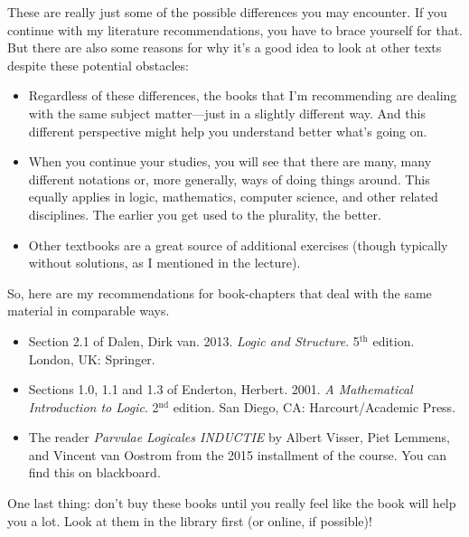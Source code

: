 These are really just some of the possible differences you may encounter. If you continue with my literature recommendations, you have to brace yourself for that. But there are also some reasons for why it's a good idea to look at other texts despite these potential obstacles:
	\begin{itemize}
	
		\item Regardless of these differences, the books that I'm recommending are dealing with the same subject matter---just in a slightly different way. And this different perspective might help you understand better what's going on.
		
		\item When you continue your studies, you will see that there are  many, many different notations or, more generally, ways of doing things around. This equally applies in logic, mathematics, computer science, and other related disciplines. The earlier you get used to the plurality, the better.
			
		\item Other textbooks are a great source of additional exercises (though typically without solutions, as I mentioned in the lecture).	
			
	\end{itemize}
So, here are my recommendations for book-chapters that deal with the same material in comparable ways. 

	\begin{itemize}
	
		\item Section 2.1 of Dalen, Dirk van. 2013. \emph{Logic and Structure}. 5$^\text{th}$ edition. London, UK: Springer.
		
		\item Sections 1.0, 1.1 and 1.3 of Enderton, Herbert. 2001. \emph{A Mathematical Introduction to Logic}. 2$^\text{nd}$ edition. San Diego, CA: Harcourt/Academic Press.
		
		\item The reader \emph{Parvulae Logicales INDUCTIE} by Albert Visser, Piet Lemmens, and Vincent van Oostrom from the 2015 installment of the course. You can find this on blackboard.
	
	\end{itemize}
One last thing: don't buy these books until you really feel like the book will help you a lot. Look at them in the library first (or online, if possible)!


\vfill

